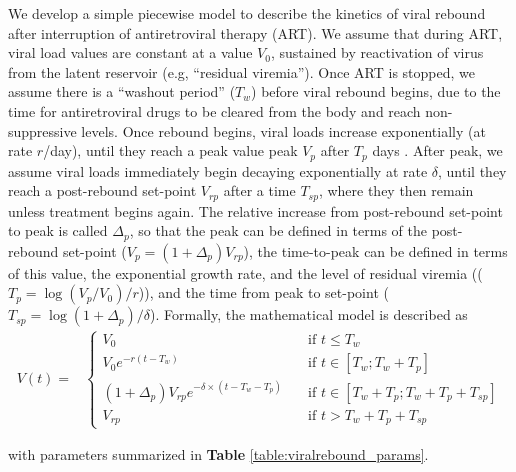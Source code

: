 \documentclass{article}[11pt]
\begin{document}
We develop a simple piecewise model to describe the kinetics of viral rebound after interruption of antiretroviral therapy (ART). We assume that during ART, viral load values are constant at a value $V_0$, sustained by reactivation of virus from the latent reservoir (e.g, ``residual viremia''). Once ART is stopped, we assume there is a ``washout period'' ($T_w$) before viral rebound begins, due to the time for antiretroviral drugs to be cleared from the body and reach non-suppressive levels. Once rebound begins, viral loads increase exponentially (at rate $r$/day), until they reach a peak value peak $V_p$ after $T_p$ days . After peak, we assume viral loads immediately begin decaying exponentially at rate $\delta$, until they reach a post-rebound set-point $V_{rp}$ after a time $T_{sp}$, where they then remain unless treatment begins again. The relative increase from post-rebound set-point to peak is called $\Delta_p$, so that the peak can be defined in terms of the post-rebound set-point ($V_p = (1+\Delta_p) V_{rp}$), the time-to-peak can be defined in terms of this value, the exponential growth rate, and the level of residual viremia  (($T_p = \log(V_p/V_0)/r$)), and the time from peak to set-point ($T_{sp} = \log (1+\Delta_p)/\delta$). Formally, the mathematical model is described as
\begin{align}
\label{eq:structural_viralrebound}
V(t) = & \begin{cases}
    V_0   &  \quad \text{if } t \leq T_w \\
    V_0e^{-r(t-T_w)}  &  \quad \text{if } t \in [T_w ; T_w + T_p] \\
    (1+\Delta_p)V_{rp}e^{-\delta\times(t-T_w-T_p)} & \quad \text{if } t \in [T_w + T_p; T_w + T_p + T_{sp}] \\
    V_{rp} & \quad \text{if } t > T_w + T_p + T_{sp}
\end{cases}        
\end{align}

with parameters summarized in \textbf{Table} \ref{table:viralrebound_params}. 
\end{document}
